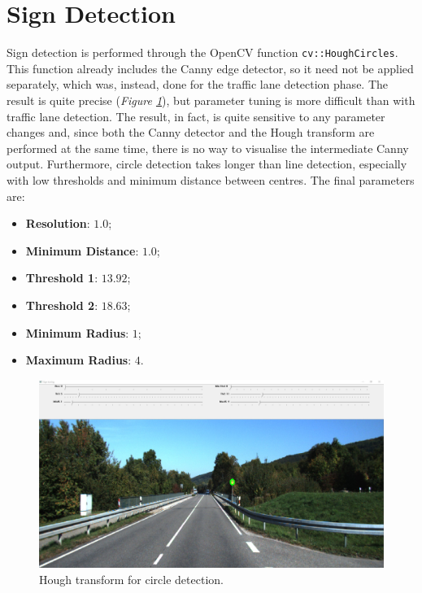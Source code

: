 \documentclass{article}
\begin{document}
\section{Sign Detection}
Sign detection is performed through the OpenCV function \texttt{cv::HoughCircles}. This function already includes the Canny edge detector, so it need not be applied separately, which was, instead, done for the traffic lane detection phase.
The result is quite precise (\textit{Figure \ref{img_hough_circles}}), but parameter tuning is more difficult than with traffic lane detection. The result, in fact, is quite sensitive to any parameter changes and, since both the Canny detector and the Hough transform are performed at the same time, there is no way to visualise the intermediate Canny output. Furthermore, circle detection takes longer than line detection, especially with low thresholds and minimum distance between centres.
The final parameters are:
\begin{itemize}
\item \textbf{Resolution}: $1.0$;
\item \textbf{Minimum Distance}: $1.0$;
\item \textbf{Threshold 1}: $13.92$;
\item \textbf{Threshold 2}: $18.63$;
\item \textbf{Minimum Radius}: $1$;
\item \textbf{Maximum Radius}: $4$.
\end{itemize}

\begin{figure}[h]
\begin{center}
\includegraphics[width=1\textwidth]{images/hough_circles}
\caption{\footnotesize{Hough transform for circle detection.}}
\label{img_hough_circles}
\end{center}
\end{figure}
\end{document}
